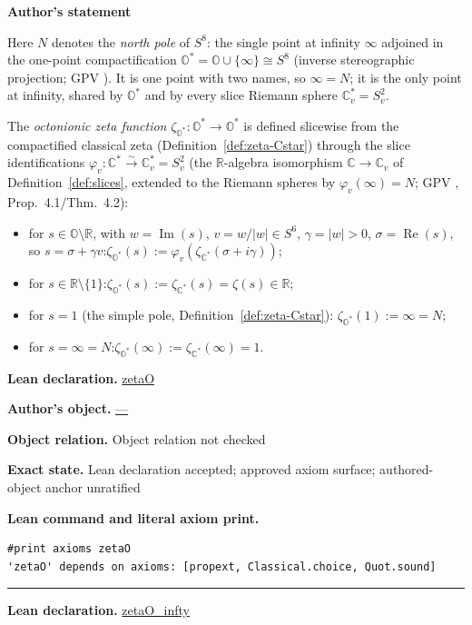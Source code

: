 \documentclass[11pt]{article}
\newcommand{\OO}{\mathbb{O}}
\newcommand{\CC}{\mathbb{C}}
\newcommand{\RR}{\mathbb{R}}
\newcommand{\Ostar}{\OO^{*}}
\newcommand{\Cstar}{\CC^{*}}
\newcommand{\zetaO}{\zeta_{\Ostar}}
\newcommand{\zetaC}{\zeta_{\Cstar}}
\DeclareMathOperator{\re}{Re}
\DeclareMathOperator{\im}{Im}
\theoremstyle{plain}
\theoremstyle{definition}
\theoremstyle{remark}
\begin{document}
\begin{tcolorbox}[provenancecard,title={17. Definition - Octonionic zeta},title after break={17. Definition - Octonionic zeta (continued)}]
\textbf{Author's statement}\par
Here $N$ denotes the \emph{north pole} of $S^8$: the single point at infinity $\infty$
adjoined in the one-point compactification $\Ostar=\OO\cup\{\infty\}\cong S^8$ (inverse
stereographic projection; GPV \cite{VS}). It is one point with two names, so $\infty=N$;
it is the only point at infinity, shared by $\Ostar$ and by every slice Riemann sphere
$\CC_v^{*}=S^2_v$.

The \emph{octonionic zeta function} $\zetaO:\Ostar\to\Ostar$ is defined slicewise from the
compactified classical zeta (Definition~\ref{def:zeta-Cstar}) through the slice
identifications $\varphi_v:\Cstar\xrightarrow{\sim}\CC_v^{*}=S^2_v$ (the $\RR$-algebra
isomorphism $\CC\to\CC_v$ of Definition~\ref{def:slices}, extended to the Riemann spheres
by $\varphi_v(\infty)=N$; GPV \cite{VS}, Prop.~4.1/Thm.~4.2):
\begin{itemize}[leftmargin=2.2em]
\item[(i)] for $s\in\OO\setminus\RR$, with $w=\im(s)$, $v=w/|w|\in S^6$, $\gamma=|w|>0$,
  $\sigma=\re(s)$, so $s=\sigma+\gamma v$:\quad $\zetaO(s):=\varphi_v(\zetaC(\sigma+i\gamma))$;
\item[(ii)] for $s\in\RR\setminus\{1\}$:\quad $\zetaO(s):=\zetaC(s)=\zeta(s)\in\RR$;
\item[(iii)] for $s=1$ (the simple pole, Definition~\ref{def:zeta-Cstar}):\quad
  $\zetaO(1):=\infty=N$;
\item[(iv)] for $s=\infty=N$:\quad $\zetaO(\infty):=\zetaC(\infty)=1$.
\end{itemize}
\tcblower
\textbf{Lean declaration.} \url{zetaO}
\par\textbf{Author's object.} \url{—}
\par\textbf{Object relation.} Object relation not checked
\par\textbf{Exact state.} Lean declaration accepted; approved axiom surface; authored-object anchor unratified
\par\smallskip\textbf{Lean command and literal axiom print.}
\begin{Verbatim}[breaklines=true,breakanywhere=true,fontsize=\small]
#print axioms zetaO
'zetaO' depends on axioms: [propext, Classical.choice, Quot.sound]
\end{Verbatim}
\medskip\hrule\medskip
\textbf{Lean declaration.} \url{zetaO_infty}

\end{tcolorbox}
\end{document}
